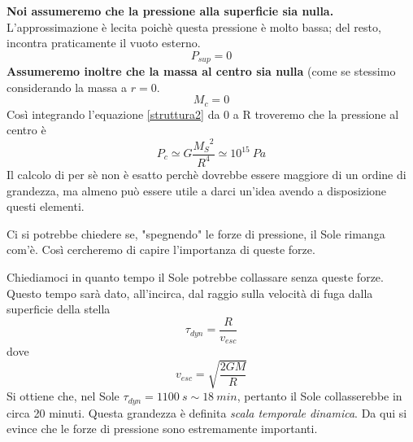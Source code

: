 \documentclass[a4paper,11pt]{article}
\begin{document}
\textbf{Noi assumeremo che la pressione alla superficie sia nulla.} L'approssimazione è lecita poichè questa pressione è molto bassa; del resto, incontra praticamente il vuoto esterno.
$$P_{sup}=0$$
\textbf{Assumeremo inoltre che la massa al centro sia nulla} (come se stessimo considerando la massa a $r=0$.
$$M_c=0$$
Così integrando l'equazione \ref{struttura2} da 0 a R troveremo che la pressione al centro è \footnotemark[1]
$$P_c\simeq G \frac{{M_S}^2}{R^4}\simeq 10^{15}\ Pa$$
Il calcolo di per sè non è esatto perchè dovrebbe essere maggiore di un ordine di grandezza, ma almeno può essere utile a darci un'idea avendo a disposizione questi elementi.\bigskip
{}
\begin{flushleft}
Ci si potrebbe chiedere se, "spegnendo" le forze di pressione, il Sole rimanga com'è.  Così cercheremo di capire l'importanza di queste forze.
\end{flushleft}
Chiediamoci in quanto tempo il Sole potrebbe collassare senza queste forze. Questo tempo sarà dato, all'incirca, dal raggio sulla velocità di fuga dalla superficie della stella
$$\tau_{dyn}=\frac{R}{v_{esc}}$$
dove
$$v_{esc}=\sqrt{\frac{2GM}{R}}$$
Si ottiene che, nel Sole $\tau_{dyn}=1100\ s\sim 18\ min$, pertanto il Sole collasserebbe in circa 20 minuti. Questa grandezza è definita \textit{scala temporale dinamica}. Da qui si evince che le forze di pressione sono estremamente importanti.
\end{document}
